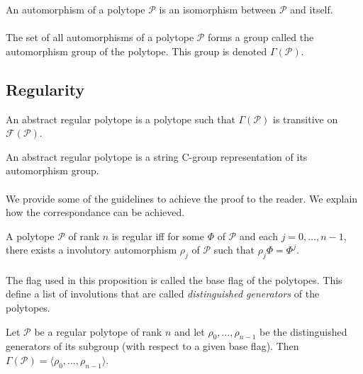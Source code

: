 \begin{definition}
  An automorphism of a polytope $\mathcal P$ is an isomorphism between $\mathcal P$ and itself.
\end{definition}

\paragraph{}
The set of all automorphisms of a polytope $\mathcal P$ forms a group called the automorphism group of the polytope. This group is denoted $\Gamma(\mathcal P)$.

\subsection{Regularity}

\begin{definition}
  An abstract regular polytope is a polytope such that $\Gamma(\mathcal P)$ is transitive on $\mathcal F(\mathcal P)$.
\end{definition}

\begin{theorem}
  An abstract regular polytope is a string C-group representation of its automorphism group.
\end{theorem}

\paragraph{}
We provide some of the guidelines to achieve the proof to the reader. We explain how the correspondance can be achieved.

\begin{proposition}
  A polytope $\mathcal P$ of rank $n$ is regular iff for some $\Phi$ of $\mathcal P$ and each $j = 0, \dots, n-1$, there exists a involutory automorphism $\rho_j$ of $\mathcal P$ such that $\rho_j \Phi = \Phi^j$.
\end{proposition}

\paragraph{}
The flag used in this proposition is called the base flag of the polytopes. This define a list of involutions that are called \textit{distinguished generators} of the polytopes.

\begin{proposition}
  Let $\mathcal P$ be a regular polytope of rank $n$ and let $\rho_0, \dots, \rho_{n-1}$ be the distinguished generators of its subgroup (with respect to a given base flag). Then $\Gamma(\mathcal P) = \langle \rho_0, \dots, \rho_{n-1} \rangle$.
\end{proposition}

